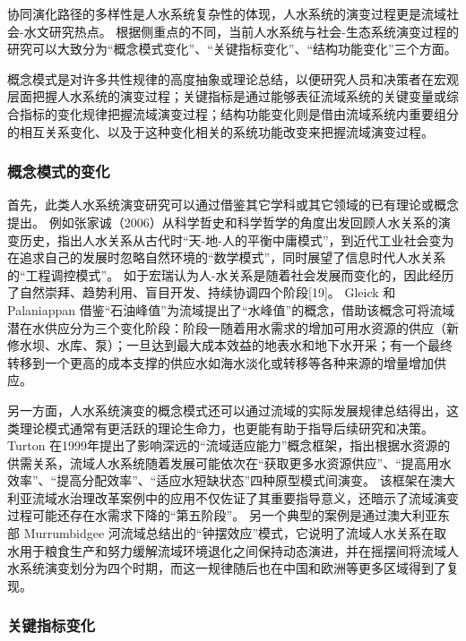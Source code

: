 协同演化路径的多样性是人水系统复杂性的体现，人水系统的演变过程更是流域社会-水文研究热点。
根据侧重点的不同，当前人水系统与社会-生态系统演变过程的研究可以大致分为“概念模式变化”、“关键指标变化”、“结构功能变化”三个方面。

概念模式是对许多共性规律的高度抽象或理论总结，以便研究人员和决策者在宏观层面把握人水系统的演变过程；关键指标是通过能够表征流域系统的关键变量或综合指标的变化规律把握流域演变过程；结构功能变化则是借由流域系统内重要组分的相互关系变化、以及于这种变化相关的系统功能改变来把握流域演变过程。

\subsubsection*{概念模式的变化}

首先，此类人水系统演变研究可以通过借鉴其它学科或其它领域的已有理论或概念提出。
例如张家诚（2006）从科学哲史和科学哲学的角度出发回顾人水关系的演变历史，指出人水关系从古代时“天-地-人的平衡中庸模式”，到近代工业社会变为在追求自己的发展时忽略自然环境的“数学模式”，同时展望了信息时代人水关系的“工程调控模式”\cite{zhang2006}。
如于宏瑞认为人-水关系是随着社会发展而变化的，因此经历了自然崇拜、趋势利用、盲目开发、持续协调四个阶段[19]。 %
Gleick 和 Palaniappan 借鉴“石油峰值”为流域提出了“水峰值”的概念，借助该概念可将流域潜在水供应分为三个变化阶段：阶段一随着用水需求的增加可用水资源的供应（新修水坝、水库、泵）；一旦达到最大成本效益的地表水和地下水开采；有一个最终转移到一个更高的成本支撑的供应水如海水淡化或转移等各种来源的增量增加供应\cite{gleick2010}。

另一方面，人水系统演变的概念模式还可以通过流域的实际发展规律总结得出，这类理论模式通常有更活跃的理论生命力，也更能有助于指导后续研究和决策。
Turton 在1999年提出了影响深远的“流域适应能力”概念框架，指出根据水资源的供需关系，流域人水系统随着发展可能依次在“获取更多水资源供应”、“提高用水效率”、“提高分配效率”、“适应水短缺状态”四种原型模式间演变\cite{turton1999}。
该框架在澳大利亚流域水治理改革案例中的应用不仅佐证了其重要指导意义，还暗示了流域演变过程可能还存在水需求下降的“第五阶段”\cite{loch2020}。
另一个典型的案例是通过澳大利亚东部 Murrumbidgee 河流域总结出的“钟摆效应”模式，它说明了流域人水关系在取水用于粮食生产和努力缓解流域环境退化之间保持动态演进，并在摇摆间将流域人水系统演变划分为四个时期\cite{kandasamy2014, roobavannan2017}，而这一规律随后也在中国和欧洲等更多区域得到了复现\cite{han2017, mostert2018}。

\subsubsection*{关键指标变化}

